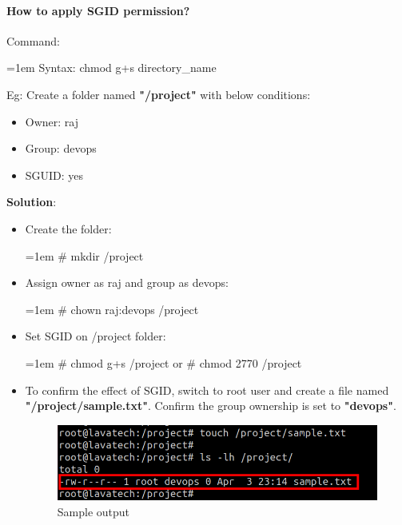 \begin{flushleft}
	\paragraph{How to apply SGID permission?}
	Command:
	\begin{tcolorbox}[breakable,notitle,boxrule=0pt,colback=pink,colframe=pink]
		\color{black}
		\font=1em
		Syntax: chmod g+s directory\_name
		\font=4pt
	\end{tcolorbox}
	Eg: Create a folder named \textbf{"/project"} with below conditions:
	\begin{itemize}
		\item Owner: raj
		\item Group: devops
		\item SGUID: yes
	\end{itemize}
	\textbf{Solution}:
	\begin{itemize}
		\item Create the folder:
		\bigskip
		\begin{tcolorbox}[breakable,notitle,boxrule=-0pt,colback=black,colframe=black]
			\color{green}
			\font=1em
			\# mkdir /project
			\font=4pt
		\end{tcolorbox}
		\item Assign owner as raj and group as devops:
		\begin{tcolorbox}[breakable,notitle,boxrule=-0pt,colback=black,colframe=black]
			\color{green}
			\font=1em
			\# chown raj:devops /project
			\font=4pt
		\end{tcolorbox}
		\item Set SGID on /project folder:
		\begin{tcolorbox}[breakable,notitle,boxrule=-0pt,colback=black,colframe=black]
			\color{green}
			\font=1em
			\# chmod g+s /project
			\newline
			\color{white}
			or
			\color{green}
			\newline
			\# chmod 2770 /project
			\font=4pt
		\end{tcolorbox}
		\item To confirm the effect of SGID, switch to root user and create a file named \textbf{"/project/sample.txt"}. Confirm the group ownership is set to \textbf{"devops"}.
		\begin{figure}[h!]
			\centering
			\includegraphics[scale=0.5]{content/chapter6/images/123.png}
			\caption{Sample output}
			\label{fig:combination_permission41}
		\end{figure}
	\end{itemize}
	\newpage

\end{flushleft}
